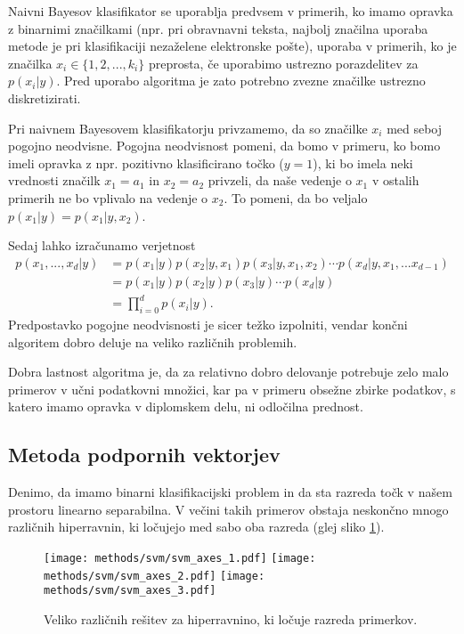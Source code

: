 \documentclass[11pt,a4paper,openany]{book}
\begin{document}

Naivni Bayesov klasifikator se uporablja predvsem v primerih, ko imamo opravka z binarnimi značilkami (npr. pri obravnavni teksta, najbolj značilna uporaba metode je pri klasifikaciji nezaželene elektronske pošte), uporaba v primerih, ko je značilka $x_i \in \{1, 2, ..., k_i\}$ preprosta, če uporabimo ustrezno porazdelitev za $p(x_i|y)$. Pred uporabo algoritma je zato potrebno zvezne značilke ustrezno diskretizirati.

Pri naivnem Bayesovem klasifikatorju privzamemo, da so značilke $x_i$ med seboj pogojno neodvisne. Pogojna neodvisnost pomeni, da bomo v primeru, ko bomo imeli opravka z npr. pozitivno klasificirano točko ($y = 1$), ki bo imela neki vrednosti značilk $x_1 = a_1$ in $x_2 = a_2$ privzeli, da naše vedenje o $x_1$ v ostalih primerih ne bo vplivalo na vedenje o $x_2$. To pomeni, da bo veljalo $p(x_1|y) = p(x_1|y, x_2)$. 

Sedaj lahko izračunamo verjetnost
\begin{equation}
	\begin{split}
	p(x_1,...,x_d|y) &= p(x_1|y)p(x_2|y, x_1)p(x_3|y,x_1,x_2) \cdots p(x_d|y,x_1,...x_{d-1}) \\
	& = p(x_1|y)p(x_2|y)p(x_3|y) \cdots p(x_d|y) \\
	& = \prod_{i=0}^{d} p(x_i|y).
	\end{split}
\end{equation}
Predpostavko pogojne neodvisnosti je sicer težko izpolniti, vendar končni algoritem dobro deluje na veliko različnih problemih.

Dobra lastnost algoritma je, da za relativno dobro delovanje potrebuje zelo malo primerov v učni podatkovni množici, kar pa v primeru obsežne zbirke podatkov, s katero imamo opravka v diplomskem delu, ni odločilna prednost.

\subsection{Metoda podpornih vektorjev}

Denimo, da imamo binarni klasifikacijski problem in da sta razreda točk v našem prostoru linearno separabilna. V večini takih primerov obstaja neskončno mnogo različnih hiperravnin, ki ločujejo med sabo oba razreda (glej sliko \ref{svmseparable}).

\begin{figure}[ht]
	\texttt{[image: methods/svm/svm\_axes\_1.pdf]}
	\texttt{[image: methods/svm/svm\_axes\_2.pdf]}
	\texttt{[image: methods/svm/svm\_axes\_3.pdf]}	
	
	\caption{Veliko različnih rešitev za hiperravnino, ki ločuje razreda primerkov.}
	\label{svmseparable}
\end{figure}
\end{document}
